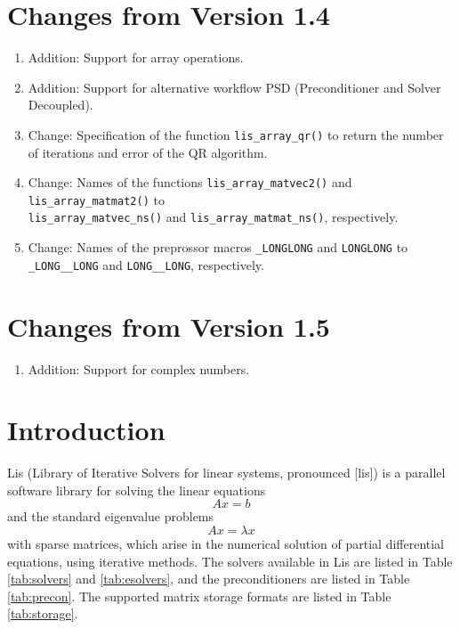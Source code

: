 \documentclass[a4paper]{article}
\begin{document}
\section*{Changes from Version 1.4}
\begin{enumerate}
\item Addition: Support for array operations.
\item Addition: Support for alternative workflow PSD (Preconditioner and Solver
      Decoupled). 
\item Change: Specification of the function 
      {\tt lis\_array\_qr()} to return 
      the number of iterations and error of the QR algorithm. 
\item Change: Names of the functions
      {\tt lis\_array\_matvec2()} and {\tt lis\_array\_matmat2()} to \\
      {\tt lis\_array\_matvec\_ns()} and {\tt lis\_array\_matmat\_ns()}, respectively.
\item Change: Names of the preprossor macros {\tt \_LONGLONG} and 
      {\tt LONGLONG} to {\tt \_LONG\_\_LONG} and {\tt LONG\_\_LONG}, respectively.
\end{enumerate}

\section*{Changes from Version 1.5}
\begin{enumerate}
\item Addition: Support for complex numbers.
\end{enumerate}
  
\newpage
\section{Introduction}
Lis (Library of Iterative Solvers for linear systems, pronounced [lis])
is a parallel software library for solving the linear equations
\[
 Ax = b
\]
and the standard eigenvalue problems
\[
 Ax = \lambda x
\]
with sparse matrices, which arise in the numerical solution of
partial differential equations, using iterative methods\cite{nishida}.
The solvers available in Lis are listed in Table \ref{tab:solvers} and
\ref{tab:esolvers}, and the preconditioners are listed in Table \ref{tab:precon}.
The supported matrix storage formats are listed in Table \ref{tab:storage}.
\end{document}
